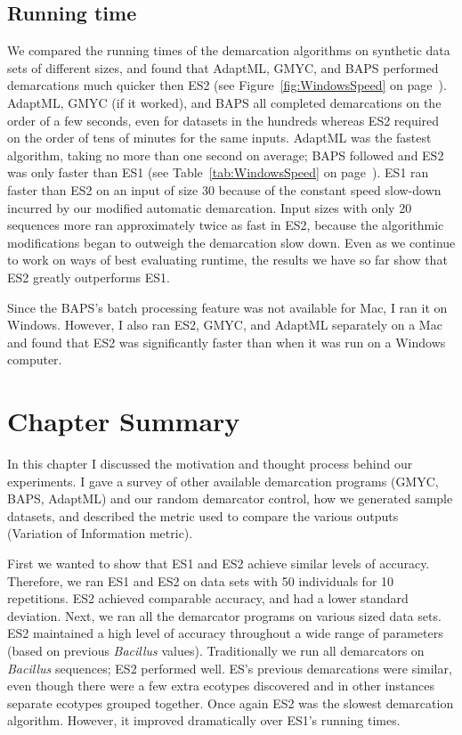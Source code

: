 \subsection*{Running time}
We compared the running times of the demarcation algorithms on synthetic data sets of different sizes, and found that AdaptML, GMYC, and BAPS performed demarcations much quicker then ES2 (see Figure~\ref{fig:WindowsSpeed} on page~\pageref{fig:WindowsSpeed}).
AdaptML, GMYC (if it worked), and BAPS all completed demarcations on the order of a few seconds, even for datasets in the hundreds whereas ES2 required on the order of tens of minutes for the same inputs.
AdaptML was the fastest algorithm, taking no more than one second on average; BAPS followed and ES2 was only faster than ES1 (see Table~\ref{tab:WindowsSpeed} on page~\pageref{tab:WindowsSpeed}).
ES1 ran faster than ES2 on an input of size 30 because of the constant speed slow-down incurred by our modified automatic demarcation.
Input sizes with only 20 sequences more ran approximately twice as fast in ES2, because the algorithmic modifications began to outweigh the demarcation slow down.
Even as we continue to work on ways of best evaluating runtime, the results we have so far show that ES2 greatly outperforms ES1.

Since the BAPS's batch processing feature was not available for Mac, I ran it on Windows.
However, I also ran ES2, GMYC, and AdaptML separately on a Mac and found that ES2 was significantly faster than when it was run on a Windows computer.

\section{Chapter Summary}
In this chapter I discussed the motivation and thought process behind our experiments.
I gave a survey of other available demarcation programs (GMYC, BAPS, AdaptML) and our random demarcator control, how we generated sample datasets, and described the metric used to compare the various outputs (Variation of Information metric).

First we wanted to show that ES1 and ES2 achieve similar levels of accuracy.
Therefore, we ran ES1 and ES2 on data sets with 50 individuals for 10 repetitions.
ES2 achieved comparable accuracy, and had a lower standard deviation.
Next, we ran all the demarcator programs on various sized data sets.
ES2 maintained a high level of accuracy throughout a wide range of parameters (based on previous \emph{Bacillus} values).
Traditionally we run all demarcators on \emph{Bacillus} sequences; ES2 performed well.
ES's previous demarcations were similar, even though there were a few extra ecotypes discovered and in other instances separate ecotypes grouped together.
Once again ES2 was the slowest demarcation algorithm.
However, it improved dramatically over ES1's running times.


